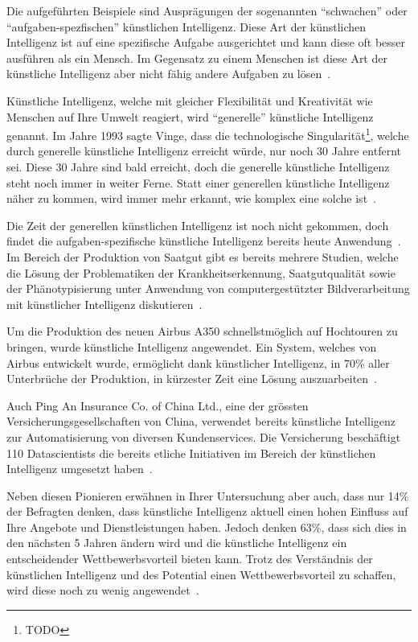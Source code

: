 Die aufgeführten Beispiele sind Ausprägungen der sogenannten \enquote{schwachen} oder \enquote{aufgaben-spezfischen} künstlichen Intelligenz. Diese Art der künstlichen Intelligenz ist auf eine spezifische Aufgabe ausgerichtet und kann diese oft besser ausführen als ein Mensch. Im Gegensatz zu einem Menschen ist diese Art der künstliche Intelligenz aber nicht fähig andere Aufgaben zu lösen~\autocite{Lu2018}.

Künstliche Intelligenz, welche mit gleicher Flexibilität und Kreativität wie Menschen auf Ihre Umwelt reagiert, wird \enquote{generelle} künstliche Intelligenz genannt. Im Jahre 1993 sagte Vinge, dass die technologische Singularität\footnote{TODO}, welche durch generelle künstliche Intelligenz erreicht würde, nur noch 30 Jahre entfernt sei. Diese 30 Jahre sind bald erreicht, doch die generelle künstliche Intelligenz steht noch immer in weiter Ferne. Statt einer generellen künstliche Intelligenz näher zu kommen, wird immer mehr erkannt, wie komplex eine solche ist~\autocite{Tredinnick2017}.

Die Zeit der generellen künstlichen Intelligenz ist noch nicht gekommen, doch findet die aufgaben-spezifische künstliche Intelligenz bereits heute Anwendung~\autocite{Tredinnick2017}. Im Bereich der Produktion von Saatgut gibt es bereits mehrere Studien, welche die Lösung der Problematiken der Krankheitserkennung, Saatgutqualität sowie der Phänotypisierung unter Anwendung von computergestützter Bildverarbeitung mit künstlicher Intelligenz diskutieren~\autocite{Patricio2018}. 

Um die Produktion des neuen Airbus A350 schnellstmöglich auf Hochtouren zu bringen, wurde künstliche Intelligenz angewendet. Ein System, welches von Airbus entwickelt wurde, ermöglicht dank künstlicher Intelligenz, in 70\% aller Unterbrüche der Produktion, in kürzester Zeit eine Lösung auszuarbeiten~\autocite{Ransbotham2017}.

Auch Ping An Insurance Co. of China Ltd., eine der grössten Versicherungsgesellschaften von China, verwendet bereits künstliche Intelligenz zur Automatisierung von diversen Kundenservices. Die Versicherung beschäftigt 110 Datascientists die bereits etliche Initiativen im Bereich der künstlichen Intelligenz umgesetzt haben~\autocite{Ransbotham2017}.

Neben diesen Pionieren erwähnen \textcite{Ransbotham2017} in Ihrer Untersuchung aber auch, dass nur 14\% der Befragten denken, dass künstliche Intelligenz aktuell einen hohen Einfluss auf Ihre Angebote und Dienstleistungen haben. Jedoch denken 63\%, dass sich dies in den nächsten 5 Jahren ändern wird und die künstliche Intelligenz ein entscheidender Wettbewerbsvorteil bieten kann. Trotz des Verständnis der künstlichen Intelligenz und des Potential einen Wettbewerbsvorteil zu schaffen, wird diese noch zu wenig angewendet~\autocite{Ransbotham2017}.

